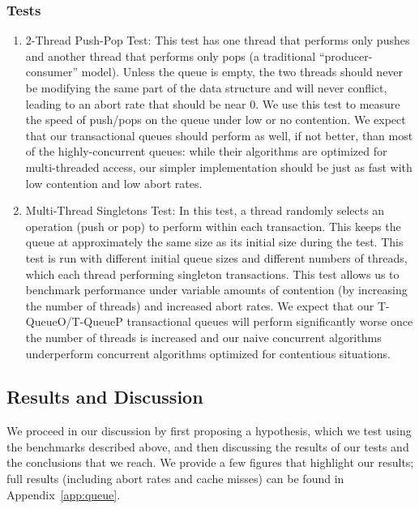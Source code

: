 \subsubsection{Tests}
\begin{enumerate}
    \item 2-Thread Push-Pop Test: This test has one thread that performs only pushes and another thread that performs only pops (a traditional ``producer-consumer'' model). Unless the queue is empty, the two threads should never be modifying the same part of the data structure and will never conflict, leading to an abort rate that should be near 0. We use this test to measure the speed of push/pops on the queue under low or no contention. We expect that our transactional queues should perform as well, if not better, than most of the highly-concurrent queues: while their algorithms are optimized for multi-threaded access, our simpler implementation should be just as fast with low contention and low abort rates.

\item Multi-Thread Singletons Test: 
    In this test, a thread randomly selects an operation (push or pop) to perform within each transaction. This keeps the queue at approximately the same size as its initial size during the test. This test is run with different initial queue sizes and different numbers of threads, which each thread performing singleton transactions. This test allows us to benchmark performance under variable amounts of contention (by increasing the number of threads) and increased abort rates. We expect that our T-QueueO/T-QueueP transactional queues will perform significantly worse once the number of threads is increased and our naive concurrent algorithms underperform concurrent algorithms optimized for contentious situations.
\end{enumerate}

\subsection{Results and Discussion}

We proceed in our discussion by first proposing a hypothesis, which we test using the benchmarks described above, and then discussing the results of our tests and the conclusions that we reach.
We provide a few figures that highlight our results; full results (including abort rates and cache misses) can be found in Appendix~\ref{app:queue}. 


